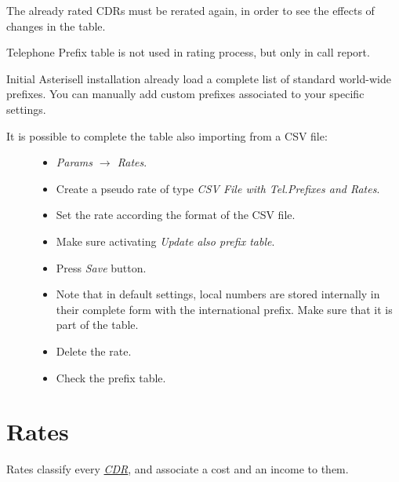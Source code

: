 \documentclass[letterpaper,10pt,english]{sphinxmanual}
\begin{document}
The already rated CDRs must be rerated again, in order to see the effects of changes in the table.

Telephone Prefix table is not used in rating process, but only in call report.

Initial Asterisell installation already load a complete list of standard world-wide prefixes. You can manually add custom prefixes associated to your specific settings.
\begin{description}
\item[{It is possible to complete the table also importing from a CSV file:}] \leavevmode\begin{itemize}
\item {} 
\emph{Params \(\rightarrow\) Rates}.

\item {} 
Create a pseudo rate of type \emph{CSV File with Tel.Prefixes and Rates}.

\item {} 
Set the rate according the format of the CSV file.

\item {} 
Make sure activating \emph{Update also prefix table}.

\item {} 
Press \emph{Save} button.

\item {} 
Note that in default settings, local numbers are stored internally in their complete form with the international prefix. Make sure that it is part of the table.

\item {} 
Delete the rate.

\item {} 
Check the prefix table.

\end{itemize}

\end{description}


\section{Rates}
\label{index:cdr-rating-process}\label{index:rates}
Rates classify every {\hyperref[index:term-cdr]{\emph{CDR}}}, and associate a cost and an income to them.
\end{document}
